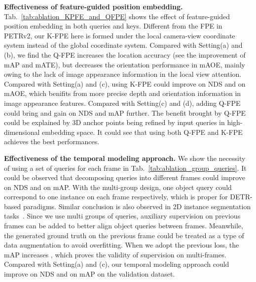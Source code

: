 \documentclass[10pt,twocolumn,letterpaper]{article}
\begin{document}
\vspace{2mm}
\noindent\textbf{Effectiveness of feature-guided position embedding.}
Tab.~\ref{tab:ablation_KPFE_and_QFPE} shows the effect of feature-guided position embedding in both queries and keys. 
Different from the FPE in PETRv2\cite{paszke2019pytorch}, our K-FPE here is formed under the local camera-view coordinate system instead of the global coordinate system. Compared with Setting(a) and (b), we find the Q-FPE increases the location accuracy (see the improvement of mAP and mATE), but decreases the orientation performance in mAOE, mainly owing to the lack of image appearance information in the local view attention. Compared with Setting(a) and (c), using K-FPE could improve  on NDS and  on mAOE, which benifits from more precise depth and orientation information in image appearance features. Compared with Setting(c) and (d), adding Q-FPE could bring  and  gain on NDS and mAP further. The benefit brought by Q-FPE could be explained by 3D anchor points being refined by input queries in high-dimensional embedding space. It could see that using both Q-FPE and K-FPE achieves the best performances. 


\vspace{2mm}
\noindent\textbf{Effectiveness of the temporal modeling approach.} We show the necessity of using a set of queries for each frame in Tab.~\ref{tab:ablation_group_queries}. It could be observed that decomposing queries into different frames could improve  on NDS and  on mAP. With the multi-group design, one object query could correspond to one instance on each frame respectively, which 
is proper for DETR-based paradigms. Similar conclusion is also observed in 2D instance segmentation tasks~\cite{wu2021seqformer}. Since we use multi groups of queries, auxiliary supervision on previous frames can be added to better align object queries between frames. Meanwhile, the generated ground truth on the previous frame could be treated as a type of data augmentation to avoid overfitting. When we 
adopt the previous loss, the mAP increases , which proves the validity of supervision on multi-frames. Compared with Setting(a) and (c), our temporal modeling approach could improve  on NDS and  on mAP on the validation dataset. 
\end{document}
